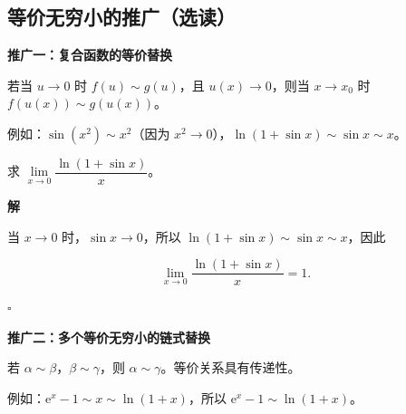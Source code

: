 \documentclass[fontset=fandol]{ctexart}
\newenvironment{extra}{\begin{mdframed}[style=extrastyle, frametitle={* 选读内容（不要求掌握）}]}{\end{mdframed}}
\newenvironment{custom}[1]{\par\noindent\textbf{#1}\quad}{\par\vspace{0.8em}}
\newenvironment{solution}{\par\noindent\textbf{解}\quad}{\hfill$\square$\par\vspace{0.8em}}
\newcommand{\ee}{\mathrm{e}}
\begin{document}
\begin{extra}

\subsection*{等价无穷小的推广（选读）}





\begin{custom}{推广一：复合函数的等价替换}

若当 \(u \to 0\) 时 \(f(u) \sim g(u)\)，且 \(u(x) \to 0\)，则当 \(x \to x_0\) 时 \(f(u(x)) \sim g(u(x))\)。



例如：\(\sin(x^2) \sim x^2\)（因为 \(x^2 \to 0\)），\(\ln(1+\sin x) \sim \sin x \sim x\)。



\begin{example}

求 \(\lim\limits_{x \to 0} \dfrac{\ln(1 + \sin x)}{x}\)。

\end{example}

\begin{solution}

当 \(x \to 0\) 时，\(\sin x \to 0\)，所以 \(\ln(1+\sin x) \sim \sin x \sim x\)，因此

\[

\lim_{x \to 0} \dfrac{\ln(1+\sin x)}{x} = 1.

\]

\end{solution}

\end{custom}



\begin{custom}{推广二：多个等价无穷小的链式替换}

若 \(\alpha \sim \beta\)，\(\beta \sim \gamma\)，则 \(\alpha \sim \gamma\)。等价关系具有传递性。



例如：\(\ee^x - 1 \sim x \sim \ln(1+x)\)，所以 \(\ee^x - 1 \sim \ln(1+x)\)。

\end{custom}

\end{extra}





\iffalse
\end{document}
